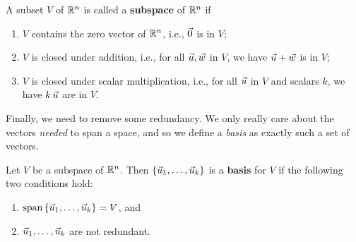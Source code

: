 \documentclass{ximera}
\begin{document}
\begin{exploration}
\begin{definition}

  A subset $V$ of $\mathbb{R}^n$ is called a \textbf{subspace}%
  of $\mathbb{R}^n$ if
  \begin{enumerate}
  \item $V$ contains the zero vector of $\mathbb{R}^n$, i.e., $\vec{0}$ is in $V$;
  \item $V$ is closed under addition, i.e., for all
    $\vec{u},\vec{w}$ in $V$, we have $\vec{u}+\vec{w}$ is in $V$;
  \item $V$ is closed under scalar multiplication, i.e., for all
    $\vec{u}$ in $V$ and scalars $k$, we have $k\,\vec{u}$ are in $V$.
  \end{enumerate}
\end{definition}

Finally, we need to remove some redundancy. We only really care about the vectors \emph{needed} to span a space, and so we define a \emph{basis} as exactly such a set of vectors.

\begin{definition}

  Let $V$ be a subspace of\/ $\mathbb{R}^n$. Then
  $\left\{\vec{u}_1,\ldots,\vec{u}_k\right\}$ is a \textbf{basis} for
  $V$ if the following two conditions hold:%
  \begin{enumerate}
  \item $\text{span}\left\{\vec{u}_1,\ldots,\vec{u}_k\right\}=V$, and
  \item $\vec{u}_1,\ldots,\vec{u}_k$ are not redundant.
  \end{enumerate}
\end{definition}



\end{exploration}
\end{document}

